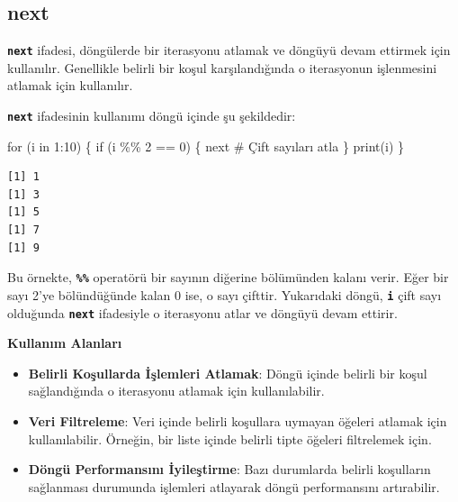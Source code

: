 \documentclass[
  letterpaper,
  DIV=11,
  numbers=noendperiod]{scrreprt}
\newenvironment{Shaded}{\begin{snugshade}}{\end{snugshade}}
\newcommand{\CommentTok}[1]{\textcolor[rgb]{0.37,0.37,0.37}{#1}}
\newcommand{\ControlFlowTok}[1]{\textcolor[rgb]{0.00,0.23,0.31}{#1}}
\newcommand{\DecValTok}[1]{\textcolor[rgb]{0.68,0.00,0.00}{#1}}
\newcommand{\FunctionTok}[1]{\textcolor[rgb]{0.28,0.35,0.67}{#1}}
\newcommand{\NormalTok}[1]{\textcolor[rgb]{0.00,0.23,0.31}{#1}}
\newcommand{\SpecialCharTok}[1]{\textcolor[rgb]{0.37,0.37,0.37}{#1}}
\begin{document}
\subsection{next}\label{next}

\textbf{\texttt{next}} ifadesi, döngülerde bir iterasyonu atlamak ve
döngüyü devam ettirmek için kullanılır. Genellikle belirli bir koşul
karşılandığında o iterasyonun işlenmesini atlamak için kullanılır.

\textbf{\texttt{next}} ifadesinin kullanımı döngü içinde şu şekildedir:

\begin{Shaded}
\begin{Highlighting}[]
\ControlFlowTok{for}\NormalTok{ (i }\ControlFlowTok{in} \DecValTok{1}\SpecialCharTok{:}\DecValTok{10}\NormalTok{) \{}
  \ControlFlowTok{if}\NormalTok{ (i }\SpecialCharTok{\%\%} \DecValTok{2} \SpecialCharTok{==} \DecValTok{0}\NormalTok{) \{}
    \ControlFlowTok{next}  \CommentTok{\# Çift sayıları atla}
\NormalTok{  \}}
  \FunctionTok{print}\NormalTok{(i)}
\NormalTok{\}}
\end{Highlighting}
\end{Shaded}

\begin{verbatim}
[1] 1
[1] 3
[1] 5
[1] 7
[1] 9
\end{verbatim}

Bu örnekte, \textbf{\texttt{\%\%}} operatörü bir sayının diğerine
bölümünden kalanı verir. Eğer bir sayı 2'ye bölündüğünde kalan 0 ise, o
sayı çifttir. Yukarıdaki döngü, \textbf{\texttt{i}} çift sayı olduğunda
\textbf{\texttt{next}} ifadesiyle o iterasyonu atlar ve döngüyü devam
ettirir.

\textbf{Kullanım Alanları}

\begin{itemize}
\item
  \textbf{Belirli Koşullarda İşlemleri Atlamak}: Döngü içinde belirli
  bir koşul sağlandığında o iterasyonu atlamak için kullanılabilir.
\item
  \textbf{Veri Filtreleme}: Veri içinde belirli koşullara uymayan
  öğeleri atlamak için kullanılabilir. Örneğin, bir liste içinde belirli
  tipte öğeleri filtrelemek için.
\item
  \textbf{Döngü Performansını İyileştirme}: Bazı durumlarda belirli
  koşulların sağlanması durumunda işlemleri atlayarak döngü
  performansını artırabilir.
\end{itemize}
\end{document}
